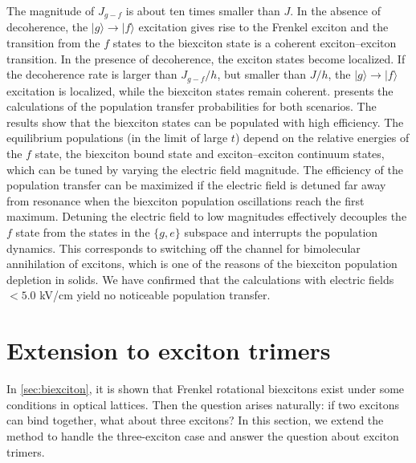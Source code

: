 The magnitude of $J_{g-f}$ is about ten times smaller than $J$.
 In the absence of decoherence, the $| g \rangle \rightarrow | f \rangle$ excitation gives rise to the Frenkel exciton and
 the transition from the $f$ states to 
 the biexciton state is a coherent exciton--exciton transition. In the presence of decoherence, the exciton states
 become localized. If the decoherence rate is larger than $J_{g-f}/h$, but smaller than $J/h$, the
 $| g \rangle \rightarrow | f \rangle$ excitation is localized, while the biexciton states remain coherent.
  presents the calculations of the population transfer probabilities for both
 scenarios. The results show that the biexciton states can be populated with high efficiency. The equilibrium
 populations (in the limit of large $t$) depend on the relative energies of the $f$ state, the biexciton bound state and
 exciton--exciton continuum states, which can be tuned by varying the electric field magnitude. 
The efficiency of the population transfer can be maximized if the electric field is detuned far away from resonance
 when the biexciton population oscillations reach the first maximum. Detuning the electric field to low magnitudes
 effectively decouples the $f$ state from the states in the $\{g,e\}$ subspace and interrupts the population dynamics.
 This corresponds to switching off the channel for bimolecular annihilation of excitons, which is one of the reasons of
 the biexciton population depletion in solids. We have confirmed that the calculations with electric fields $< 5.0$
 kV/cm yield no  noticeable population transfer. 

\section{Extension to exciton trimers}
\label{sec:trimers}
In \autoref{sec:biexciton}, it is shown that Frenkel rotational biexcitons exist under some conditions in optical lattices. 
Then the question arises naturally: if two excitons can bind together, what about three excitons? In this section, we
extend the method to handle the three-exciton case and answer the question about exciton trimers. 

